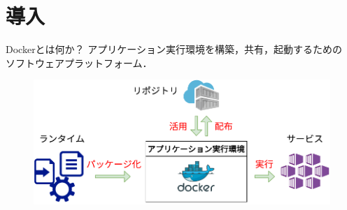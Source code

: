 \section{導入}

\begin{frame}{Dockerとは何か？}
    アプリケーション実行環境を構築，共有，起動するための\\ソフトウェアプラットフォーム．

    \begin{figure}
        \centering
        \includegraphics[width=\linewidth]{img/docker.pdf}
    \end{figure}
\end{frame}


